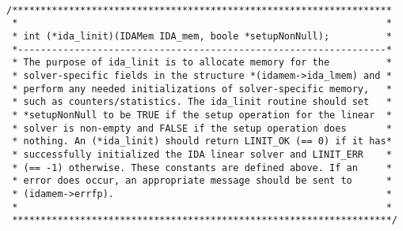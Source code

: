 \documentclass[11pt]{article}
\begin{document}
\small
\begin{verbatim}

/*******************************************************************
 *                                                                 *
 * int (*ida_linit)(IDAMem IDA_mem, boole *setupNonNull);          *
 *-----------------------------------------------------------------*
 * The purpose of ida_linit is to allocate memory for the          *
 * solver-specific fields in the structure *(idamem->ida_lmem) and *
 * perform any needed initializations of solver-specific memory,   *
 * such as counters/statistics. The ida_linit routine should set   *
 * *setupNonNull to be TRUE if the setup operation for the linear  *
 * solver is non-empty and FALSE if the setup operation does       *
 * nothing. An (*ida_linit) should return LINIT_OK (== 0) if it has*
 * successfully initialized the IDA linear solver and LINIT_ERR    *
 * (== -1) otherwise. These constants are defined above. If an     *
 * error does occur, an appropriate message should be sent to      *
 * (idamem->errfp).                                                *
 *                                                                 *
 *******************************************************************/


\end{verbatim}
\end{document}

